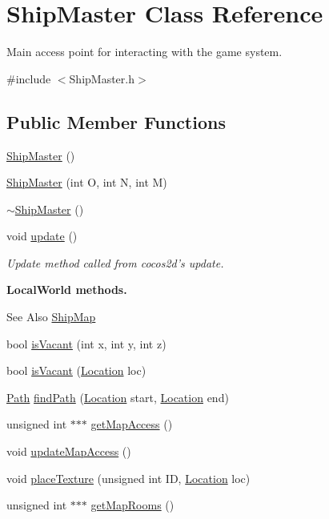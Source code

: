 \hypertarget{classShipMaster}{\section{Ship\-Master Class Reference}
\label{classShipMaster}
}


Main access point for interacting with the game system.  




{\ttfamily \#include $<$Ship\-Master.\-h$>$}

\subsection*{Public Member Functions}
\begin{DoxyCompactItemize}
\item 
\hyperlink{classShipMaster_a607690189ed059378e939c9500909c9a}{Ship\-Master} ()
\item 
\hyperlink{classShipMaster_aad717c55623a33a03bab50381e0386e1}{Ship\-Master} (int O, int N, int M)
\item 
\hyperlink{classShipMaster_a1000b9a0ab83b8984a3d1e72f9db621e}{$\sim$\-Ship\-Master} ()
\item 
void \hyperlink{classShipMaster_a2e1b2737d8c4ab6ff0c64b046d437718}{update} ()
\begin{DoxyCompactList}\small\item\em Update method called from cocos2d's update. \end{DoxyCompactList}\end{DoxyCompactItemize}
\begin{Indent}{\bf Local\-World methods.}\par
{\em \begin{DoxySeeAlso}{See Also}
\hyperlink{classShipMap}{Ship\-Map} 
\end{DoxySeeAlso}
}\begin{DoxyCompactItemize}
\item 
bool \hyperlink{classShipMaster_a2225b60d05aa9229f93856ad7b916b58}{is\-Vacant} (int x, int y, int z)
\item 
bool \hyperlink{classShipMaster_ae2f8c7068a577e8cddabc28583be8cf8}{is\-Vacant} (\hyperlink{structLocation}{Location} loc)
\item 
\hyperlink{classPath}{Path} \hyperlink{classShipMaster_aa5c31f505493362afdef36a00ba94956}{find\-Path} (\hyperlink{structLocation}{Location} start, \hyperlink{structLocation}{Location} end)
\item 
unsigned int $\ast$$\ast$$\ast$ \hyperlink{classShipMaster_a334be261a5e3d9c50caa7506f0b2609c}{get\-Map\-Access} ()
\item 
void \hyperlink{classShipMaster_a73b87519cbfc8289f9628695ebcc0cdb}{update\-Map\-Access} ()
\item 
void \hyperlink{classShipMaster_ae90bf5dd5fa1cbf24a4ddbd7b84e3446}{place\-Texture} (unsigned int I\-D, \hyperlink{structLocation}{Location} loc)
\item 
unsigned int $\ast$$\ast$$\ast$ \hyperlink{classShipMaster_a59892b34be3b803dc72ab332b783ad2c}{get\-Map\-Rooms} ()
\end{DoxyCompactItemize}
\end{Indent}
